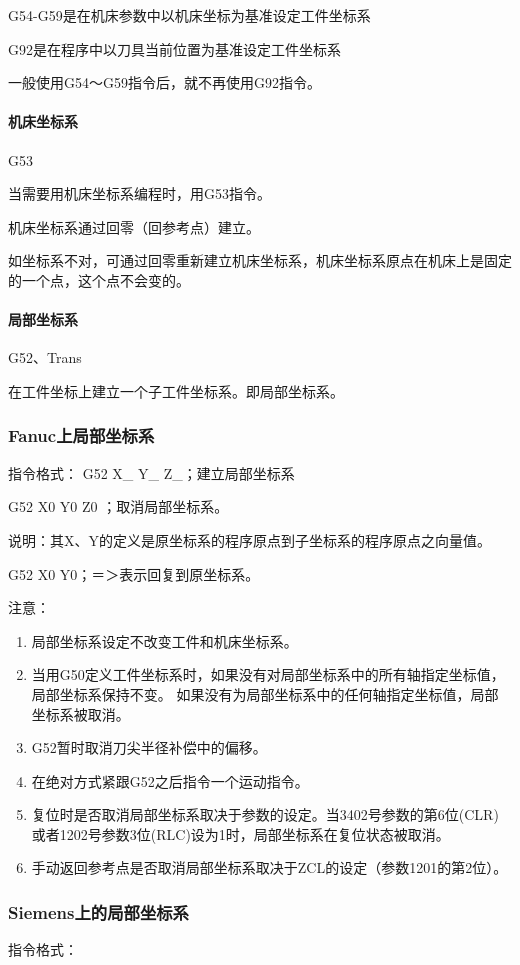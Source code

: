 G54-G59是在机床参数中以机床坐标为基准设定工件坐标系

G92是在程序中以刀具当前位置为基准设定工件坐标系

一般使用G54～G59指令后，就不再使用G92指令。

\paragraph{机床坐标系}
G53

当需要用机床坐标系编程时，用G53指令。

机床坐标系通过回零（回参考点）建立。

如坐标系不对，可通过回零重新建立机床坐标系，机床坐标系原点在机床上是固定的一个点，这个点不会变的。
\paragraph{局部坐标系}
G52、Trans

在工件坐标上建立一个子工件坐标系。即局部坐标系。
\subsubsection{Fanuc上局部坐标系}
指令格式：  G52 X\_ Y\_ Z\_；建立局部坐标系

G52 X0 Y0 Z0 ；取消局部坐标系。

说明：其X、Y的定义是原坐标系的程序原点到子坐标系的程序原点之向量值。

G52 X0 Y0；＝＞表示回复到原坐标系。

注意：
\begin{enumerate}[\hspace{2em}A、]
	\item 局部坐标系设定不改变工件和机床坐标系。 
\item 当用G50定义工件坐标系时，如果没有对局部坐标系中的所有轴指定坐标值，局部坐标系保持不变。
如果没有为局部坐标系中的任何轴指定坐标值，局部坐标系被取消。 
\item G52暂时取消刀尖半径补偿中的偏移。 
\item 在绝对方式紧跟G52之后指令一个运动指令。 
\item 复位时是否取消局部坐标系取决于参数的设定。当3402号参数的第6位(CLR)或者1202号参数3位(RLC)设为1时，局部坐标系在复位状态被取消。 
\item 手动返回参考点是否取消局部坐标系取决于ZCL的设定（参数1201的第2位）。
\end{enumerate}
\subsubsection{Siemens上的局部坐标系}
指令格式：

